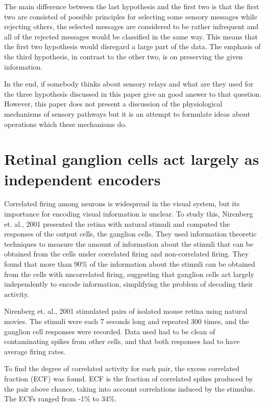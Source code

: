 \documentclass[twoside]{article}
\begin{document}
\begin{multicols}{2}
The main difference between the last hypothesis and the first two is that the first two are consisted of possible principles for selecting some sensory messages while rejecting others, the selected messages are considered to be rather infrequent and all of the rejected messages would be classified in the same way. This means that the first two hypothesis would disregard a large part of the data. The emphasis of the third hypothesis, in contrast to the other two, is on preserving the given information.

In the end, if somebody thinks about sensory relays and what are they used for the three hypothesis discussed in this paper give an good answer to that question. However, this paper does not present a discussion of the physiological mechanisms of sensory pathways but it is an attempt to formulate ideas about operations which these mechanisms do. 


\section{Retinal ganglion cells act largely as independent encoders}

\footnotesize
Correlated firing among neurons is widespread in the visual system, but its importance for encoding visual information is unclear. To study this, Nirenberg et. al., 2001 presented the retina with natural stimuli and computed the responses of the output cells, the ganglion cells. They used information theoretic techniques to measure the amount of information about the stimuli that can be obtained from the cells under correlated firing and non-correlated firing. They found that more than 90\% of the information about the stimuli can be obtained from the cells with uncorrelated firing, suggesting that ganglion cells act largely independently to encode information, simplifying the problem of decoding their activity. 

\normalsize
Nirenberg et. al., 2001 stimulated pairs of isolated mouse retina using natural movies. The stimuli were each 7 seconds long and repeated 300 times, and the ganglion cell responses were recorded. Data used had to be clean of contaminating spikes from other cells, and that both responses had to have average firing rates. 

To find the degree of correlated activity for each pair, the excess correlated fraction (ECF) was found. ECF is the fraction of correlated spikes produced by the pair above chance, taking into account correlations induced by the stimulus. The ECFs ranged from -1\% to 34\%. 


\end{multicols}
\end{document}
